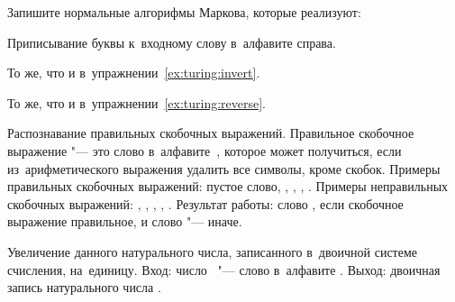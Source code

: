 \bigskip
Запишите нормальные алгорифмы Маркова, которые реализуют:
\begin{exercise}[resume*=statemachine]
\item\label{ex:markov:addx} Приписывание буквы  к~входному слову в~алфавите  справа.

\item То же, что и в~упражнении~\ref{ex:turing:invert}.

\item То же, что и в~упражнении~\ref{ex:turing:reverse}.

\item Распознавание правильных скобочных выражений. Правильное скобочное выражение "--- это слово в~алфавите~\code{\{(,)\}}, которое может получиться, если из~арифметического выражения удалить все символы, кроме скобок. Примеры правильных скобочных выражений: пустое слово, \code{()}, \code{(())()}, \code{()()}, \code{((()))}. Примеры неправильных скобочных выражений: \code{)(}, \code{())(()}, \code{(}, \code{))))}, \code{((())}. Результат работы: слово , если скобочное выражение правильное, и слово  "--- иначе.

\item Увеличение данного натурального числа, записанного в~двоичной системе счисления, на~единицу. Вход: число~ "--- слово в~алфавите . Выход: двоичная запись натурального числа .
\end{exercise}